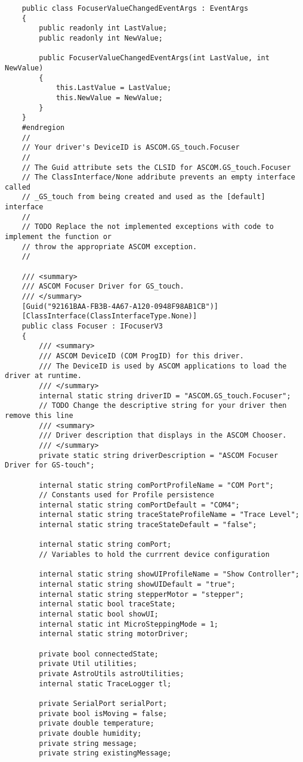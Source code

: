 \begin{lstlisting}
	public class FocuserValueChangedEventArgs : EventArgs
	{
		public readonly int LastValue;
		public readonly int NewValue;
		
		public FocuserValueChangedEventArgs(int LastValue, int NewValue)
		{
			this.LastValue = LastValue;
			this.NewValue = NewValue;
		}
	}
	#endregion
	//
	// Your driver's DeviceID is ASCOM.GS_touch.Focuser
	//
	// The Guid attribute sets the CLSID for ASCOM.GS_touch.Focuser
	// The ClassInterface/None addribute prevents an empty interface called
	// _GS_touch from being created and used as the [default] interface
	//
	// TODO Replace the not implemented exceptions with code to implement the function or
	// throw the appropriate ASCOM exception.
	//
	
	/// <summary>
	/// ASCOM Focuser Driver for GS_touch.
	/// </summary>
	[Guid("92161BAA-FB3B-4A67-A120-0948F98AB1CB")]
	[ClassInterface(ClassInterfaceType.None)]
	public class Focuser : IFocuserV3
	{
		/// <summary>
		/// ASCOM DeviceID (COM ProgID) for this driver.
		/// The DeviceID is used by ASCOM applications to load the driver at runtime.
		/// </summary>
		internal static string driverID = "ASCOM.GS_touch.Focuser";
		// TODO Change the descriptive string for your driver then remove this line
		/// <summary>
		/// Driver description that displays in the ASCOM Chooser.
		/// </summary>
		private static string driverDescription = "ASCOM Focuser Driver for GS-touch";
		
		internal static string comPortProfileName = "COM Port"; 
		// Constants used for Profile persistence
		internal static string comPortDefault = "COM4";
		internal static string traceStateProfileName = "Trace Level";
		internal static string traceStateDefault = "false";
		
		internal static string comPort; 
		// Variables to hold the currrent device configuration
		
		internal static string showUIProfileName = "Show Controller";
		internal static string showUIDefault = "true";
		internal static string stepperMotor = "stepper";
		internal static bool traceState;
		internal static bool showUI;
		internal static int MicroSteppingMode = 1;
		internal static string motorDriver;
		
		private bool connectedState;
		private Util utilities;
		private AstroUtils astroUtilities;
		internal static TraceLogger tl;
		
		private SerialPort serialPort;
		private bool isMoving = false;
		private double temperature;
		private double humidity;
		private string message;
		private string existingMessage;
		

\end{lstlisting}

